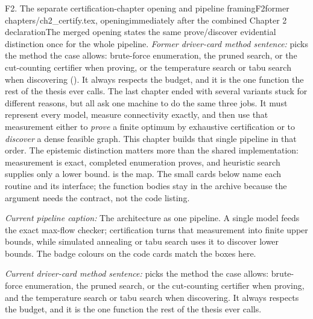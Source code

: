 \begin{offcutrewrite}{F2. The separate certification-chapter opening and pipeline framing}{F2}{former chapters/ch2\_certify.tex, opening}{immediately after the combined Chapter 2 declaration}{The merged opening states the same prove/discover evidential distinction once for the whole pipeline.}
\noindent\emph{Former driver-card method sentence:}
picks the method the case allows: brute-force enumeration, the pruned search, or the cut-counting certifier when proving, or the temperature search or tabu search when discovering (). It always respects the budget, and it is the one function the rest of the thesis ever calls.
\nowreads
The last chapter ended with several variants stuck for different reasons, but all ask one machine to do the same three jobs. It must represent every model, measure connectivity exactly, and then use that measurement either to \emph{prove} a finite optimum by exhaustive certification or to \emph{discover} a dense feasible graph. This chapter builds that single pipeline in that order. The epistemic distinction matters more than the shared implementation: measurement is exact, completed enumeration proves, and heuristic search supplies only a lower bound.  is the map. The small cards below name each routine and its interface; the function bodies stay in the archive because the argument needs the contract, not the code listing.

\noindent\emph{Current pipeline caption:}
The architecture as one pipeline. A single model feeds the exact max-flow checker; certification turns that measurement into finite upper bounds, while simulated annealing or tabu search uses it to discover lower bounds. The badge colours on the code cards match the boxes here.

\noindent\emph{Current driver-card method sentence:}
picks the method the case allows: brute-force enumeration, the pruned search, or the cut-counting certifier when proving, and the temperature search or tabu search when discovering. It always respects the budget, and it is the one function the rest of the thesis ever calls.
\end{offcutrewrite}

